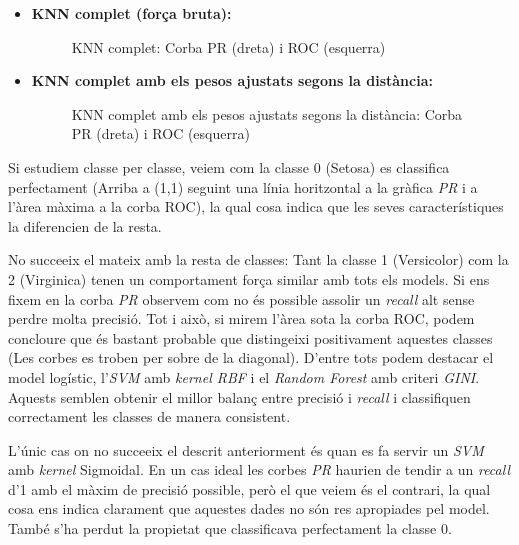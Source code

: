 \documentclass[a4paper, 11pt]{article}
\begin{document}
\begin{itemize}
            \item \textbf{KNN complet (força bruta):}


                \begin{figure}[H]%
                \centering
                \qquad
                \caption*{KNN complet: Corba PR (dreta) i ROC (esquerra)}
                \end{figure}

            \newpage
            \item \textbf{KNN complet amb els pesos ajustats segons la distància:}


                \begin{figure}[H]%
                \centering
                \qquad
                \caption*{KNN complet amb els pesos ajustats segons la distància: Corba PR (dreta) i ROC (esquerra)}
                \end{figure}
        \end{itemize}

        Si estudiem classe per classe, veiem com la classe 0 (Setosa) es classifica perfectament
        (Arriba a (1,1) seguint una línia horitzontal a la gràfica \textit{PR} i a l'àrea màxima a la corba
        ROC), la qual cosa indica que les seves característiques la diferencien de la resta.

        No succeeix el mateix amb la resta de classes: Tant la classe 1 (Versicolor) com la 2
        (Virginica) tenen un comportament força similar amb tots els models. Si ens fixem en la
        corba \textit{PR} observem com no és possible assolir un \textit{recall} alt sense perdre molta
        precisió. Tot i això, si mirem l'àrea sota la corba ROC, podem concloure que és bastant
        probable que distingeixi positivament aquestes classes (Les corbes es troben per sobre de
        la diagonal).
        D'entre tots podem destacar el model logístic, l'\textit{SVM} amb \textit{kernel RBF} i el \textit{Random
        Forest} amb criteri \textit{GINI}. Aquests semblen obtenir el millor balanç entre precisió i
        \textit{recall} i classifiquen correctament les classes de manera consistent.

        L'únic cas on no succeeix el descrit anteriorment és quan es fa servir un \textit{SVM} amb \textit{kernel}
        Sigmoidal. En un cas ideal les corbes \textit{PR} haurien de tendir a un \textit{recall} d'1 amb el
        màxim de precisió possible, però el que veiem és el contrari, la qual cosa ens indica
        clarament que aquestes dades no són res apropiades pel model. També s'ha perdut la propietat
         que classificava perfectament la classe 0.
\end{document}
